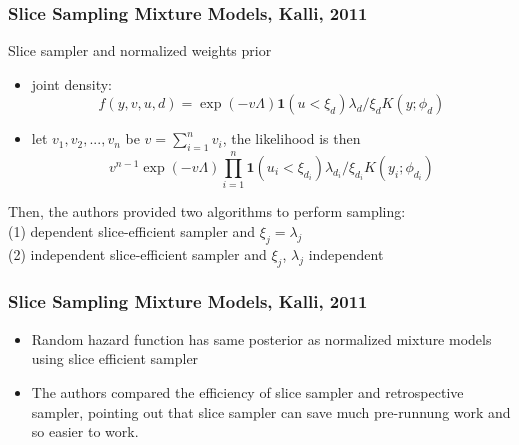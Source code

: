 \documentclass{beamer}
\begin{document}
\begin{frame}
    \frametitle{Slice Sampling Mixture Models, Kalli, 2011}
    Slice sampler and normalized weights prior 
    \begin{itemize}
    \item joint density: $$f(y, v, u, d)=\exp (-v \Lambda) \textbf{1}\left(u<\xi_{d}\right) \lambda_{d} / \xi_{d} K\left(y ; \phi_{d}\right)$$
    \item let  $v_1, v_2,...,v_{n}$ be $v=\sum_{i=1}^{n} v_{i}$, the likelihood is then $$v^{n-1} \exp (-v \Lambda) \prod_{i=1}^{n} \textbf{1}\left(u_{i}<\xi_{d_{i}}\right) \lambda_{d_{i}} / \xi_{d_{i}} K\left(y_{i} ; \phi_{d_{i}}\right)$$
    \end{itemize}
    Then, the authors provided two algorithms to perform sampling:\\
    (1) dependent slice-efficient sampler and $\xi_{j}=\lambda_{j}$\\
    (2) independent slice-efficient sampler and $\xi_{j}$, $\lambda_{j}$ independent
\end{frame}

\begin{frame}
    \frametitle{Slice Sampling Mixture Models, Kalli, 2011}
        \begin{itemize}
            \item Random hazard function has same posterior as normalized mixture models using slice efficient sampler
            \item The authors compared the efficiency of slice sampler and retrospective sampler, pointing out that slice sampler can save much pre-runnung work and so easier to work.
    
        \end{itemize}
\end{frame}
\end{document}
